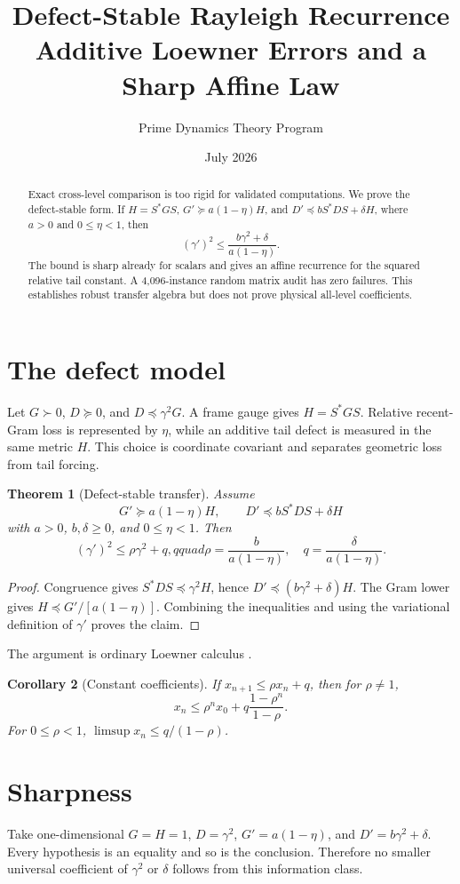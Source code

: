 \documentclass[12pt]{article}\usepackage[margin=1in]{geometry}\usepackage{amsmath,amssymb,amsthm,graphicx,natbib,microtype}\newtheorem{theorem}{Theorem}\newtheorem{corollary}[theorem]{Corollary}
\title{Defect-Stable Rayleigh Recurrence\\\large Additive Loewner Errors and a Sharp Affine Law}\author{Prime Dynamics Theory Program}\date{July 2026}
\begin{document}
\maketitle
\begin{abstract}
Exact cross-level comparison is too rigid for validated computations.  We
prove the defect-stable form.  If $H=S^*GS$,
$G'\succeq a(1-\eta)H$, and
$D'\preceq bS^*DS+\delta H$, where $a>0$ and $0\leq\eta<1$, then
\[
 (\gamma')^2\leq\frac{b\gamma^2+\delta}{a(1-\eta)}.
\]
The bound is sharp already for scalars and gives an affine recurrence for
the squared relative tail constant.  A 4,096-instance random matrix audit
has zero failures.  This establishes robust transfer algebra but does not
prove physical all-level coefficients.
\end{abstract}
\section{The defect model}
Let $G\succ0$, $D\succeq0$, and $D\preceq\gamma^2G$.  A frame gauge gives
$H=S^*GS$.  Relative recent-Gram loss is represented by $\eta$, while an
additive tail defect is measured in the same metric $H$.  This choice is
coordinate covariant and separates geometric loss from tail forcing.

\begin{theorem}[Defect-stable transfer]\label{thm:defect}
Assume
\[
G'\succeq a(1-\eta)H,\qquad
D'\preceq bS^*DS+\delta H
\]
with $a>0$, $b,\delta\geq0$, and $0\leq\eta<1$.  Then
\[
(\gamma')^2\leq\rho\gamma^2+q,qquad
\rho=\frac{b}{a(1-\eta)},\quad q=\frac{\delta}{a(1-\eta)}.
\]
\end{theorem}
\begin{proof}
Congruence gives $S^*DS\preceq\gamma^2H$, hence
$D'\preceq(b\gamma^2+\delta)H$.  The Gram lower gives
$H\preceq G'/[a(1-\eta)]$.  Combining the inequalities and using the
variational definition of $\gamma'$ proves the claim.
\end{proof}
The argument is ordinary Loewner calculus \citep{Bhatia2007,HornJohnson1991}.

\begin{corollary}[Constant coefficients]
If $x_{n+1}\leq\rho x_n+q$, then for $\rho\ne1$,
\[
x_n\leq\rho^nx_0+q\frac{1-\rho^n}{1-\rho}.
\]
For $0\leq\rho<1$, $\limsup x_n\leq q/(1-\rho)$.
\end{corollary}

\section{Sharpness}
Take one-dimensional $G=H=1$, $D=\gamma^2$,
$G'=a(1-\eta)$, and $D'=b\gamma^2+\delta$.  Every hypothesis is an equality
and so is the conclusion.  Therefore no smaller universal coefficient of
$\gamma^2$ or $\delta$ follows from this information class.
\end{document}
